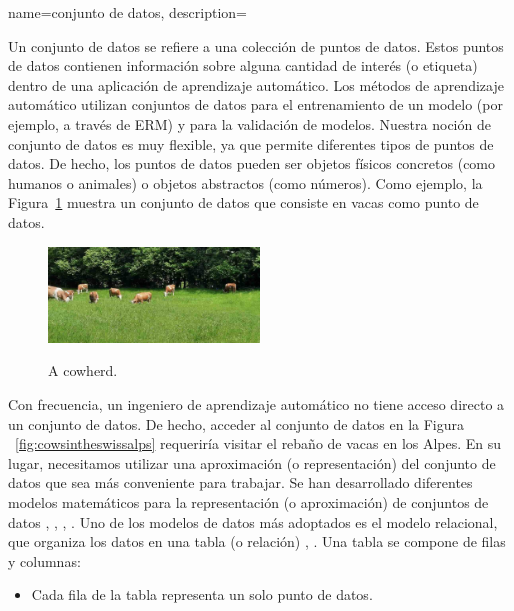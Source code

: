 {name={conjunto de datos},
	description={Un conjunto de datos se refiere a una colección de puntos de datos. Estos 
		puntos de datos contienen información sobre alguna cantidad de interés (o etiqueta) dentro 
		de una aplicación de aprendizaje automático. Los métodos de aprendizaje automático utilizan conjuntos de datos para el entrenamiento de un modelo (por ejemplo, a través de ERM)
		y para la validación de modelos. Nuestra noción de conjunto de datos es muy flexible, 
		ya que permite diferentes tipos de puntos de datos. De hecho, los puntos de datos pueden ser objetos físicos concretos
		(como humanos o animales) o objetos abstractos (como números).
		Como ejemplo, la Figura\ \ref{fig_cows_dataset} muestra un conjunto de datos que consiste en vacas como 
		punto de datos. 
		\begin{figure}[H]
				\begin{center}
		\label{fig:cowsintheswissalps}
		\includegraphics[width=0.5\textwidth]{../../assets/CowsAustria.jpg}
		  \end{center}
		\caption{\label{fig_cows_dataset} A cowherd.}
	  \end{figure}
	   Con frecuencia, un ingeniero de aprendizaje automático no tiene acceso directo a un conjunto de datos. De hecho, acceder al conjunto de datos en la Figura 
       \ \ref{fig:cowsintheswissalps} requeriría visitar el rebaño de vacas en los Alpes. En su lugar, 
	   necesitamos utilizar una aproximación (o representación) del conjunto de datos que sea más conveniente para trabajar. 
       Se han desarrollado diferentes modelos matemáticos para la representación (o aproximación) de conjuntos de datos  
       \cite{silberschatz2019database}, \cite{abiteboul1995foundations}, \cite{hoberman2009data}, \cite{ramakrishnan2002database}. 
	   Uno de los modelos de datos más adoptados es el modelo relacional, que organiza los datos
       en una tabla (o relación) \cite{codd1970relational}, \cite{silberschatz2019database}.
	   Una tabla se compone de filas y columnas:
		\begin{itemize} 
		\item Cada fila de la tabla representa un solo punto de datos.

\end{itemize}}}
